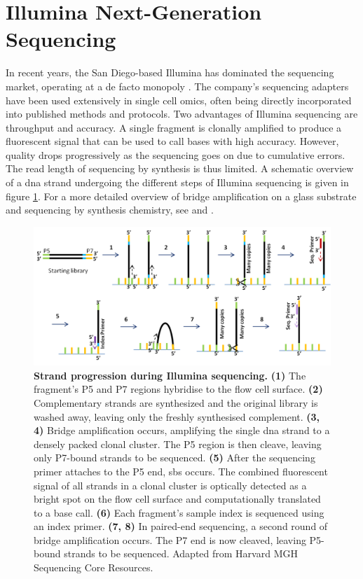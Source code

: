 \section{Illumina Next-Generation Sequencing}
In recent years, the San Diego-based Illumina has dominated the sequencing market, operating at a de facto monopoly \citep{greenleaf2014}. The company's sequencing adapters have been used extensively in single cell omics, often being directly incorporated into published methods and protocols. Two advantages of Illumina sequencing are throughput and accuracy. A single fragment is clonally amplified to produce a fluorescent signal that can be used to call bases with high accuracy. However, quality drops progressively as the sequencing goes on due to cumulative errors. The read length of sequencing by synthesis is thus limited. A schematic overview of a \acrshort{dna} strand undergoing the different steps of Illumina sequencing is given in figure \ref{fig:seq_illuminasequencing}. For a more detailed overview of bridge amplification on a glass substrate and sequencing by synthesis chemistry, see \cite{fedurco2006} and \cite{harris2008}.\pms

\begin{figure}[ht]
	\centerfloat
	\includegraphics[width=\textwidth]{./ims/seq_illuminasequencing.png}
	\caption[Strand progression during Illumina sequencing]{\textbf{Strand progression during Illumina sequencing.} \textbf{(1)} The fragment's P5 and P7 regions hybridise to the flow cell surface. \textbf{(2)} Complementary strands are synthesized and the original library is washed away, leaving only the freshly synthesised complement. \textbf{(3, 4)} Bridge amplification occurs, amplifying the single \acrshort{dna} strand to a densely packed clonal cluster. The P5 region is then cleave, leaving only P7-bound strands to be sequenced. \textbf{(5)} After the sequencing primer attaches to the P5 end, \acrfull{sbs} occurs. The combined fluorescent signal of all strands in a clonal cluster is optically detected as a bright spot on the flow cell surface and computationally translated to a base call. \textbf{(6)} Each fragment's sample index is sequenced using an index primer. \textbf{(7, 8)} In paired-end sequencing, a second round of bridge amplification occurs. The P7 end is now cleaved, leaving P5-bound strands to be sequenced. Adapted from Harvard MGH Sequencing Core Resources.}
	\label{fig:seq_illuminasequencing}
\end{figure}

